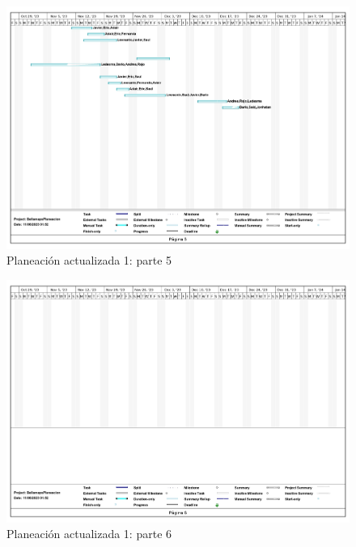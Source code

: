 \documentclass{article}
\begin{document}
\begin{figure}[h]
    \centering
    \includegraphics[width=1\linewidth]{BellamapsPlaneacionA1_5.jpg}
    \caption{Planeación actualizada 1: parte 5}
    \label{fig:Planeación actualizada 1  parte 5}
\end{figure}
\begin{figure}[h]
    \centering
    \includegraphics[width=1\linewidth]{BellamapsPlaneacionA1_6.jpg}
    \caption{Planeación actualizada 1: parte 6}
    \label{fig:Planeación actualizada 1  parte 6}
\end{figure}



\printindex
\end{document}
